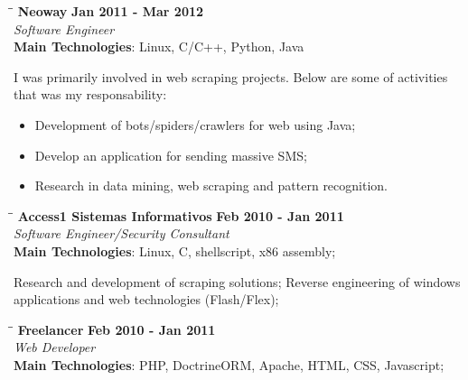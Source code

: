 \documentclass[margin]{res}
\begin{document}
\begin{resume}
   \begin{tabbing}
   \hspace{2.3in}\= \hspace{1.7in}\= \kill %
    \textbf{Neoway}    \>\>\textbf{Jan 2011 - Mar 2012}\\
    \textit{Software Engineer}\\   
    \textbf{Main Technologies}: Linux, C/C++, Python, Java
   \end{tabbing}\vspace{-20pt}      %
    \vspace{2mm}
    I was primarily involved in web scraping projects. Below are some of activities that was my responsability:
    
    \begin{itemize}
  \item Development of bots/spiders/crawlers for web using Java;
  \item Develop an application for sending massive SMS;
  \item Research in data mining, web scraping and pattern recognition.
\end{itemize}

   
   \vspace{2mm}
   \begin{tabbing}
   \hspace{2.3in}\= \hspace{1.5in}\= \kill %
    \textbf{Access1 Sistemas Informativos}    \>\>\textbf{Feb 2010 - Jan 2011}\\
    \textit{Software Engineer/Security Consultant}\\   
    \textbf{Main Technologies}: Linux, C, shellscript, x86 assembly;
   \end{tabbing}\vspace{-20pt}      %
    \vspace{2mm}
    
    Research and development of scraping solutions;
    Reverse engineering of windows applications and web technologies (Flash/Flex);
    
       
   \vspace{2mm}
   \begin{tabbing}
   \hspace{2.3in}\= \hspace{1.5in}\= \kill %
    \textbf{Freelancer}    \>\>\textbf{Feb 2010 - Jan 2011}\\
    \textit{Web Developer}\\   
    \textbf{Main Technologies}: PHP, DoctrineORM, Apache, HTML, CSS, Javascript;
   \end{tabbing}\vspace{-20pt}      %
    \vspace{2mm}
    

\end{resume}
\end{document}
